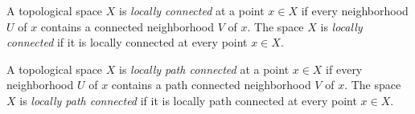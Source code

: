 \documentclass[12pt]{article}
\begin{document}
A topological space $X$ is {\em locally connected} at a point $x \in X$ if every neighborhood $U$ of $x$ contains a connected neighborhood $V$ of $x$. The space $X$ is {\em locally connected} if it is locally connected at every point $x \in X$.

A topological space $X$ is {\em locally path connected} at a point $x \in X$ if every neighborhood $U$ of $x$ contains a path connected neighborhood $V$ of $x$. The space $X$ is {\em locally path connected} if it is locally path connected at every point $x \in X$.
\end{document}
